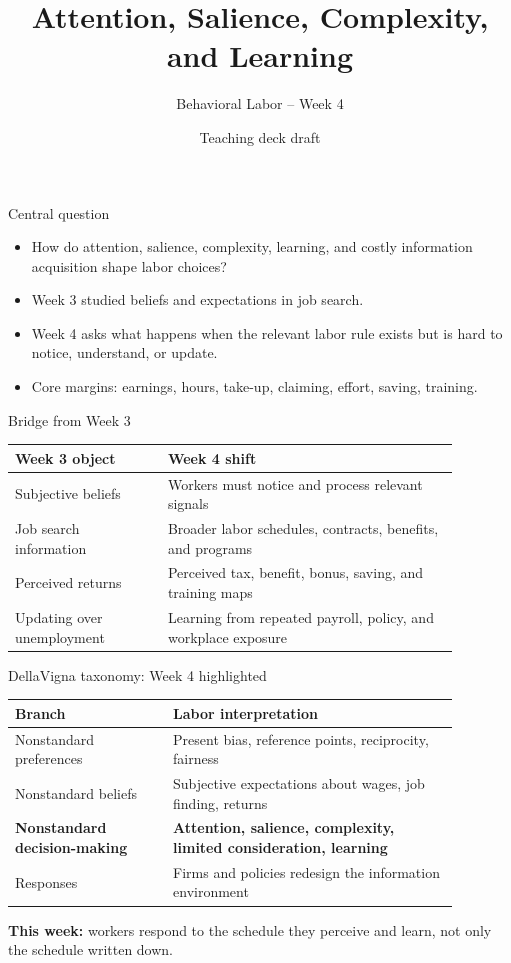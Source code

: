 \documentclass[aspectratio=169,11pt]{beamer}
\title{Attention, Salience, Complexity, and Learning}
\subtitle{Behavioral Labor -- Week 4}
\author{Teaching deck draft}
\date{}
\begin{document}
\begin{frame}
  \titlepage
\end{frame}

\begin{frame}{Central question}
\begin{itemize}
    \item How do attention, salience, complexity, learning, and costly information acquisition shape labor choices?
    \item Week 3 studied beliefs and expectations in job search.
    \item Week 4 asks what happens when the relevant labor rule exists but is hard to notice, understand, or update.
    \item Core margins: earnings, hours, take-up, claiming, effort, saving, training.
\end{itemize}
\end{frame}

\begin{frame}{Bridge from Week 3}
\small
\begin{tabular}{p{0.30\linewidth} p{0.58\linewidth}}
\toprule
Week 3 object & Week 4 shift \\
\midrule
Subjective beliefs & Workers must notice and process relevant signals \\
Job search information & Broader labor schedules, contracts, benefits, and programs \\
Perceived returns & Perceived tax, benefit, bonus, saving, and training maps \\
Updating over unemployment & Learning from repeated payroll, policy, and workplace exposure \\
\bottomrule
\end{tabular}
\end{frame}

\begin{frame}{DellaVigna taxonomy: Week 4 highlighted}
\small
\begin{tabular}{p{0.31\linewidth} p{0.57\linewidth}}
\toprule
Branch & Labor interpretation \\
\midrule
Nonstandard preferences & Present bias, reference points, reciprocity, fairness \\
Nonstandard beliefs & Subjective expectations about wages, job finding, returns \\
\textbf{Nonstandard decision-making} & \textbf{Attention, salience, complexity, limited consideration, learning} \\
Responses & Firms and policies redesign the information environment \\
\bottomrule
\end{tabular}

\vspace{0.5em}
\textbf{This week:} workers respond to the schedule they perceive and learn, not only the schedule written down.
\end{frame}
\end{document}
